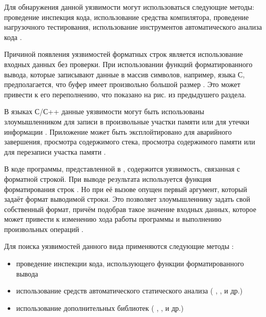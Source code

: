 %
Для обнаружения данной уязвимости могут использоваться следующие методы: проведение инспекция кода, использование средства компилятора, проведение нагрузочного тестирования, использование инструментов автоматического анализа кода   .



%
Причиной появления уязвимостей форматных строк является использование входных данных без проверки. 
%
При использовании функций форматированного вывода, которые записывают данные в массив символов, например,  языка С, предполагается, что буфер имеет произвольно большой размер . 
%
Это может привести к его переполнению, что показано на рис. из предыдушего раздела.

%
В языках С/С++ данные уязвимости могут быть использованы злоумышленником для записи в произвольные участки памяти или для утечки информации . 
%
Приложение может быть эксплойтировано для аварийного завершения, просмотра содержимого стека, просмотра содержимого памяти или для перезаписи участка памяти   . 

%
В коде программы, представленной в , содержится уязвимость, связанная с форматной строкой.
%
При выводе результата используется функция форматирования строк . 
%
Но при её вызове опущен первый аргумент, который задаёт формат выводимой строки. 
%
Это позволяет злоумышленнику задать свой собственный формат, причём подобрав такое значение входных данных, которое может привести к изменению хода работы программы и выполнению произвольных операций 
. 

%
Для поиска уязвимостей данного вида применяются следующие методы  
: 
\begin{itemize}

	\item проведение инспекции кода, использующего функции форматированного вывода 
	
	\item использование средств автоматического статического анализа ( ,  ,   и др.) 
	
	\item использование дополнительных библиотек ( ,  ,   и др.) 
\end{itemize}

